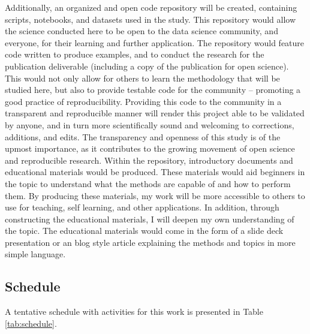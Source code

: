 \documentclass[11pt]{report}
\begin{document}
Additionally, an organized and open code repository will be created, containing scripts, notebooks, and datasets used in the study. This repository would allow the science conducted here to be open to the data science community, and everyone, for their learning and further application. The repository would feature code written to produce examples, and to conduct the research for the publication deliverable (including a copy of the publication for open science). This would not only allow for others to learn the methodology that will be studied here, but also to provide testable code for the community -- promoting a good practice of reproducibility. Providing this code to the community in a transparent and reproducible manner will render this project able to be validated by anyone, and in turn more scientifically sound and welcoming to corrections, additions, and edits. The transparency and openness of this study is of the upmost importance, as it contributes to the growing movement of open science and reproducible research. Within the repository, introductory documents and educational materials would be produced. These materials would aid beginners in the topic to understand what the methods are capable of and how to perform them. By producing these materials, my work will be more accessible to others to use for teaching, self learning, and other applications. In addition, through constructing the educational materials, I will deepen my own understanding of the topic. The educational materials would come in the form of a slide deck presentation or an blog style article explaining the methods and topics in more simple language.



\subsection{Schedule}
 
A tentative schedule with activities for this work is presented in Table \ref{tab:schedule}.
\end{document}
